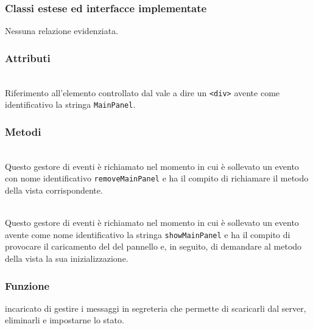\subsubsection*{Classi estese ed interfacce implementate}
Nessuna relazione evidenziata.

\subsubsection*{Attributi}
\begin{description}
\item{}\\
  Riferimento all'elemento controllato dal  vale a dire un \verb'<div>' avente come identificativo la stringa \verb'MainPanel'.
\end{description}

\subsubsection*{Metodi}
\begin{description}

  \item{}\\
  Questo gestore di eventi è richiamato nel momento in cui è sollevato un evento con nome identificativo \texttt{removeMainPanel} e ha il compito di richiamare il metodo  della vista corrispondente.
  
  \item{}\\
  Questo gestore di eventi è richiamato nel momento in cui è sollevato un evento avente come nome identificativo la stringa \texttt{showMainPanel} e ha il compito di provocare il caricamento del  del pannello e, in seguito, di demandare al metodo  della vista la sua inizializzazione.

\end{description}



\subsubsection*{Funzione}
 incaricato di gestire i messaggi in segreteria che permette di scaricarli dal server, eliminarli e impostarne lo stato.


